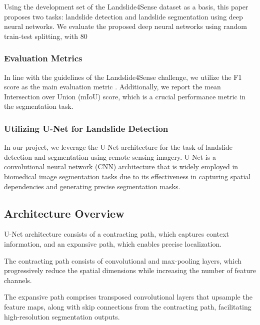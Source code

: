 \documentclass[12pt,a4paper]{report}
\begin{document}
Using the development set of the Landslide4Sense dataset as a basis, this paper proposes two tasks: landslide detection and landslide segmentation using deep neural networks. We evaluate the proposed deep neural networks using random train-test splitting, with 80%

\subsubsection{Evaluation Metrics}

In line with the guidelines of the Landslide4Sense challenge, we utilize the F1 score as the main evaluation metric . Additionally, we report the mean Intersection over Union (mIoU) score, which is a crucial performance metric in the segmentation task.

\subsubsection{Utilizing U-Net for Landslide Detection}

In our project, we leverage the U-Net architecture for the task of landslide detection and segmentation using remote sensing imagery. U-Net is a convolutional neural network (CNN) architecture that is widely employed in biomedical image segmentation tasks due to its effectiveness in capturing spatial dependencies and generating precise segmentation masks.


\newpage
	\label{Architecture Overview}
	\subsection{Architecture Overview}
	U-Net architecture consists of a contracting path, which captures context information, and an expansive path, which enables precise localization.

The contracting path consists of convolutional and max-pooling layers, which progressively reduce the spatial dimensions while increasing the number of feature channels.

The expansive path comprises transposed convolutional layers that upsample the feature maps, along with skip connections from the contracting path, facilitating high-resolution segmentation outputs.
\end{document}
